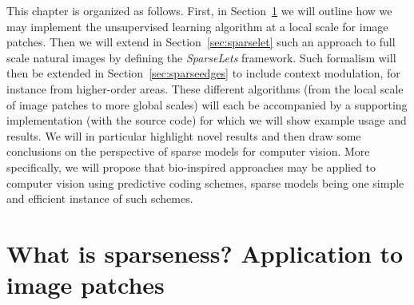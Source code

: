 \documentclass[a4paper, 11pt]{book}
\begin{document}
This chapter is organized as follows.
First, in Section~\ref{sec:sparsenet} we will outline how we may implement the unsupervised learning algorithm at a local scale for image patches.
Then we will extend in Section~\ref{sec:sparselet} such an approach to full scale natural images by defining the \emph{SparseLets} framework.
Such formalism will then be extended in Section~\ref{sec:sparseedges} to include context modulation, for instance from higher-order areas.
These different algorithms (from the local scale of image patches to more global scales)
will each be accompanied by a supporting implementation (with the source code)
for which we will show example usage and results.
We will in particular highlight novel results and then draw some conclusions on the perspective of sparse models for computer vision.
More specifically, we will propose that bio-inspired approaches
may be applied to computer vision using predictive coding schemes,
sparse models being one simple and efficient instance of such schemes.
%
\section{What is sparseness? Application to image patches}
\label{sec:sparsenet}
\end{document}
